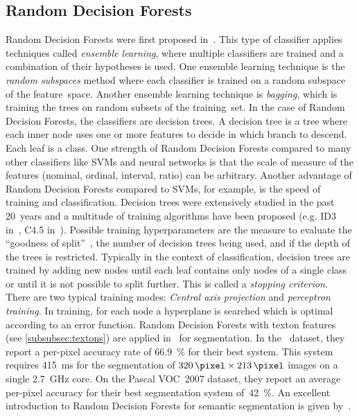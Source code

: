 \documentclass[technote,a4paper,leqno]{IEEEtran}
\begin{document}
\subsection{Random Decision Forests}\label{subsec:random-forests}
Random Decision Forests were first proposed in~\cite{ho1995random}. This type
of classifier applies techniques called \textit{ensemble learning}, where
multiple classifiers are trained and a combination of their hypotheses is
used. One ensemble learning technique is the \textit{random subspaces} method
where each classifier is trained on a random subspace of the feature~space.
Another ensemble learning technique is \textit{bagging}, which is training the
trees on random subsets of the training~set. In the case of Random Decision
Forests, the classifiers are decision trees. A decision tree is a tree where
each inner node uses one or more features to decide in which branch to descend.
Each leaf is a class.
One strength of Random Decision Forests compared to many other classifiers like
\glspl{SVM} and neural networks is that the scale of measure of the features
(nominal, ordinal, interval, ratio) can be arbitrary. Another advantage of
Random Decision Forests compared to \glspl{SVM}, for example, is the speed
of training and classification.
Decision trees were extensively studied in the past 20~years and a
multitude of training algorithms have been proposed (e.g. ID3
in~\cite{quinlan1986induction}, C4.5 in~\cite{quinlan2014c4}). Possible
training hyperparameters are the measure to evaluate the \enquote{goodness of
split}~\cite{raey89empirical}, the number of decision trees being used, and if
the depth of the trees is restricted. Typically in the context of
classification, decision trees are trained by adding new nodes until
each leaf contains only nodes of a single class or until it is not possible to
split further. This is called a \textit{stopping criterion}.
There are two typical training modes: \textit{Central axis projection} and
\textit{perceptron training}. In training, for each node a hyperplane is
searched which is optimal according to an error function.
Random Decision Forests with texton features (see \cref{subsubsec:textons}) are
applied in~\cite{shotton2008semantic} for segmentation. In the~\cite{MSCR-db}
dataset, they report a per-pixel accuracy rate of \SI{66.9}{\percent} for their
best system. This system requires \SI{415}{\milli\second} for the segmentation of
$\SI{320}{\pixel} \times \SI{213}{\pixel}$ images on a single
\SI{2.7}{\giga\hertz} core. On the Pascal VOC~2007 dataset, they report an
average per-pixel accuracy for their best segmentation system
of~\SI{42}{\percent}.
An excellent introduction to Random Decision Forests for semantic segmentation
is given by~\cite{schroff2008object}.
\end{document}
